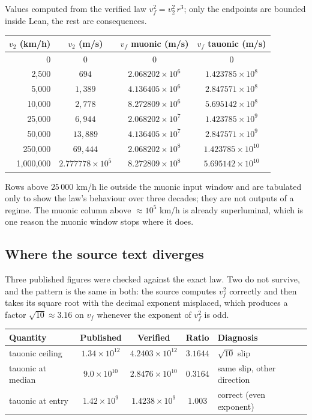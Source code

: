 \documentclass[11pt,a4paper]{article}
\begin{document}
Values computed from the verified law $v_f^2 = v_2^2\, r^{3}$; only the endpoints
are bounded inside Lean, the rest are consequences.

\begin{center}\small
\begin{tabular}{@{}rccc@{}}
\toprule
$v_2$ (km/h) & $v_2$ (m/s) & $v_f$ muonic (m/s) & $v_f$ tauonic (m/s) \\
\midrule
0 & $0$ & $0$ & $0$ \\
2,500 & $694$ & $2.068202 \times 10^{6}$ & $1.423785 \times 10^{8}$ \\
5,000 & $1{,}389$ & $4.136405 \times 10^{6}$ & $2.847571 \times 10^{8}$ \\
10,000 & $2{,}778$ & $8.272809 \times 10^{6}$ & $5.695142 \times 10^{8}$ \\
25,000 & $6{,}944$ & $2.068202 \times 10^{7}$ & $1.423785 \times 10^{9}$ \\
50,000 & $13{,}889$ & $4.136405 \times 10^{7}$ & $2.847571 \times 10^{9}$ \\
250,000 & $69{,}444$ & $2.068202 \times 10^{8}$ & $1.423785 \times 10^{10}$ \\
1,000,000 & $2.777778 \times 10^{5}$ & $8.272809 \times 10^{8}$ & $5.695142 \times 10^{10}$ \\
\bottomrule
\end{tabular}
\end{center}

\noindent Rows above $25\,000$ km/h lie outside the muonic input window and are
tabulated only to show the law's behaviour over three decades; they are not
outputs of a regime.  The muonic column above $\approx 10^{5}$ km/h is already
superluminal, which is one reason the muonic window stops where it does.

\subsection*{Where the source text diverges}

Three published figures were checked against the exact law.  Two do not survive,
and the pattern is the same in both: the source computes $v_f^2$ correctly and
then takes its square root with the decimal exponent misplaced, which produces a
factor $\sqrt{10} \approx 3.16$ on $v_f$ whenever the exponent of $v_f^2$ is odd.

\begin{center}\small
\begin{tabular}{@{}lcccl@{}}
\toprule
Quantity & Published & Verified & Ratio & Diagnosis \\
\midrule
tauonic ceiling & $1.34\times10^{12}$ & $4.2403\times10^{12}$ & $3.1644$
  & $\sqrt{10}$ slip \\
tauonic at median & $9.0\times10^{10}$ & $2.8476\times10^{10}$ & $0.3164$
  & same slip, other direction \\
tauonic at entry & $1.42\times10^{9}$ & $1.4238\times10^{9}$ & $1.003$
  & correct (even exponent) \\
\bottomrule
\end{tabular}
\end{center}
\end{document}
